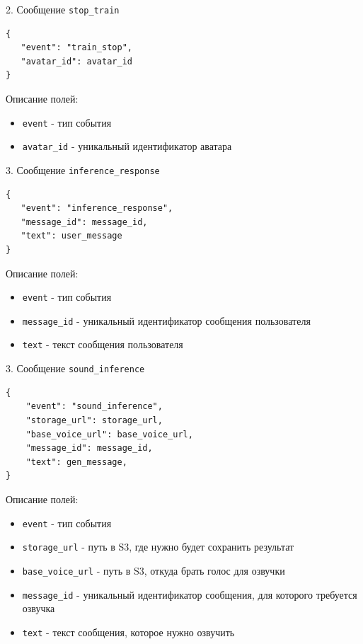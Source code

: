 2. Сообщение \texttt{stop\_train}
\begin{lstlisting}[style=jsonstyle, numbers=none, frame=none]
{
   "event": "train_stop",
   "avatar_id": avatar_id
}
\end{lstlisting}
Описание полей:
\begin{itemize}
    \item \texttt{event} - тип события
    \item \texttt{avatar\_id} - уникальный идентификатор аватара
\end{itemize}

3. Сообщение \texttt{inference\_response}
\begin{lstlisting}[style=jsonstyle, numbers=none, frame=none]
{
   "event": "inference_response",
   "message_id": message_id,
   "text": user_message
}
\end{lstlisting}
Описание полей:
\begin{itemize}
    \item \texttt{event} - тип события
    \item \texttt{message\_id} - уникальный идентификатор сообщения пользователя
    \item \texttt{text} - текст сообщения пользователя
\end{itemize}

3. Сообщение \texttt{sound\_inference}
\begin{lstlisting}[style=jsonstyle, numbers=none, frame=none]
{
    "event": "sound_inference",
    "storage_url": storage_url,
    "base_voice_url": base_voice_url,
    "message_id": message_id,
    "text": gen_message,
}
\end{lstlisting}
Описание полей:
\begin{itemize}
    \item \texttt{event} - тип события
    \item \texttt{storage\_url} - путь в S3, где нужно будет сохранить результат
    \item \texttt{base\_voice\_url} - путь в S3, откуда брать голос для озвучки
    \item \texttt{message\_id} - уникальный идентификатор сообщения, для которого требуется озвучка
    \item \texttt{text} - текст сообщения, которое нужно озвучить
\end{itemize}


